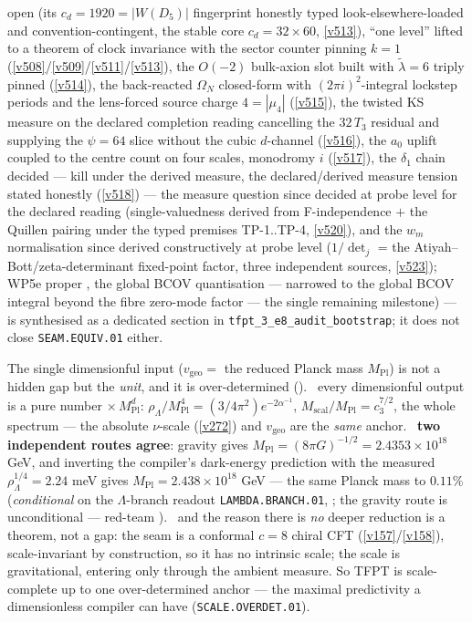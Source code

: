 \documentclass[11pt,a4paper]{article}
\newcommand{\cthree}{c_3}
\newcommand{\Mpl}{M_{\mathrm{Pl}}}
\begin{document}
\begin{keybox}
open (its $c_d=1920=|W(D_5)|$ fingerprint honestly typed look-elsewhere-loaded and
convention-contingent, the stable core $c_d=32\times60$, \vref{v513}), ``one level'' lifted to
a theorem of clock invariance with the sector
counter pinning $k=1$ (\vref{v508}/\vref{v509}/\vref{v511}/\vref{v513}), the $O(-2)$ bulk-axion
slot built with $\tilde\lambda=6$ triply pinned (\vref{v514}), the back-reacted $\Omega_N$
closed-form with $(2\pi i)^2$-integral lockstep periods and the lens-forced source charge
$4=|\mu_4|$ (\vref{v515}), the twisted KS measure on the declared completion reading cancelling
the $32\,T_3$ residual and supplying the $\psi=64$ slice without the cubic $d$-channel
(\vref{v516}), the $a_0$ uplift coupled to the centre count on four scales, monodromy $i$
(\vref{v517}), the $\delta_1$ chain decided --- kill under the derived measure, the
declared/derived measure tension stated honestly (\vref{v518}) --- the measure question
since decided at probe level for the declared reading (single-valuedness derived from
F-independence $+$ the Quillen pairing under the typed premises TP-1..TP-4, \vref{v520}),
and the $w_m$ normalisation since derived constructively at probe level ($1/\det_j$ = the
Atiyah--Bott/zeta-determinant fixed-point factor, three independent sources, \vref{v523});
WP5e proper \mO, the global BCOV
quantisation --- narrowed to the global BCOV integral beyond the fibre zero-mode factor ---
the single remaining milestone) --- is
synthesised as a
dedicated section in \texttt{tfpt\_3\_e8\_audit\_bootstrap}; it does not close \texttt{SEAM.EQUIV.01}
either.
\end{keybox}

\begin{keybox}
The single dimensionful input ($v_{\mathrm{geo}}=$ the reduced Planck mass $\Mpl$) is not a hidden gap but the
\emph{unit}, and it is over-determined (). \mE\ every dimensionful output
is a pure number $\times\,\Mpl^d$: $\rho_\Lambda/\Mpl^4=(3/4\pi^2)e^{-2\alpha^{-1}}$, $M_{\mathrm{scal}}/\Mpl
=\cthree^{7/2}$, the whole spectrum --- the absolute $\nu$-scale (\vref{v272}) and $v_{\mathrm{geo}}$ are the
\emph{same} anchor. \mC\ \textbf{two independent routes agree}: gravity gives $\Mpl=(8\pi G)^{-1/2}
=2.4353{\times}10^{18}$ GeV, and inverting the compiler's dark-energy prediction with the measured
$\rho_\Lambda^{1/4}=2.24$ meV gives $\Mpl=2.438{\times}10^{18}$ GeV --- the same Planck mass to $0.11\%$
(\emph{conditional} on the $\Lambda$-branch readout \texttt{LAMBDA.BRANCH.01}, \mC; the gravity route is
unconditional --- red-team ). \mE\ and
the reason there is \emph{no} deeper reduction is a theorem, not a gap: the seam is a conformal $c{=}8$ chiral CFT
(\vref{v157}/\vref{v158}), scale-invariant by construction, so it has no intrinsic scale; the scale is
gravitational, entering only through the ambient measure. So TFPT is scale-complete up to one over-determined
anchor --- the maximal predictivity a dimensionless compiler can have (\texttt{SCALE.OVERDET.01}).
\end{keybox}
\end{document}
